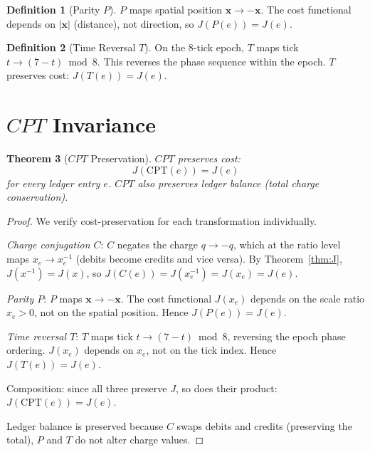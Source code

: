 \documentclass[12pt,a4paper]{article}
\newtheorem{theorem}{Theorem}[section]
\theoremstyle{definition}
\newtheorem{definition}[theorem]{Definition}
\theoremstyle{remark}
\begin{document}
\begin{definition}[Parity $P$]
$P$ maps spatial position $\mathbf{x} \to -\mathbf{x}$.  The
cost functional depends on $|\mathbf{x}|$ (distance), not
direction, so $J(P(e)) = J(e)$.
\end{definition}

\begin{definition}[Time Reversal $T$]
On the 8-tick epoch, $T$ maps tick $t \to (7 - t) \bmod 8$.
This reverses the phase sequence within the epoch.
$T$ preserves cost: $J(T(e)) = J(e)$.
\end{definition}

\section{$CPT$ Invariance}
\label{sec:cpt}

\begin{theorem}[$CPT$ Preservation]
\label{thm:cpt}
$CPT$ preserves cost:
\begin{equation}
  J(\mathrm{CPT}(e)) = J(e)
\end{equation}
for every ledger entry $e$.  $CPT$ also preserves ledger balance
(total charge conservation).
\end{theorem}

\begin{proof}
We verify cost-preservation for each transformation individually.

\textit{Charge conjugation $C$}: $C$ negates the charge $q \to -q$,
which at the ratio level maps $x_e \to x_e^{-1}$ (debits become credits
and vice versa).  By Theorem~\ref{thm:J}, $J(x^{-1}) = J(x)$, so
$J(C(e)) = J(x_e^{-1}) = J(x_e) = J(e)$.

\textit{Parity $P$}: $P$ maps $\mathbf{x} \to -\mathbf{x}$.  The cost
functional $J(x_e)$ depends on the scale ratio $x_e > 0$, not on the
spatial position.  Hence $J(P(e)) = J(e)$.

\textit{Time reversal $T$}: $T$ maps tick $t \to (7-t)\bmod 8$, reversing
the epoch phase ordering.  $J(x_e)$ depends on $x_e$, not on the tick
index.  Hence $J(T(e)) = J(e)$.

Composition: since all three preserve $J$, so does their product:
$J(\mathrm{CPT}(e)) = J(e)$.

Ledger balance is preserved because $C$ swaps debits and credits
(preserving the total), $P$ and $T$ do not alter charge values.
\end{proof}
\end{document}
